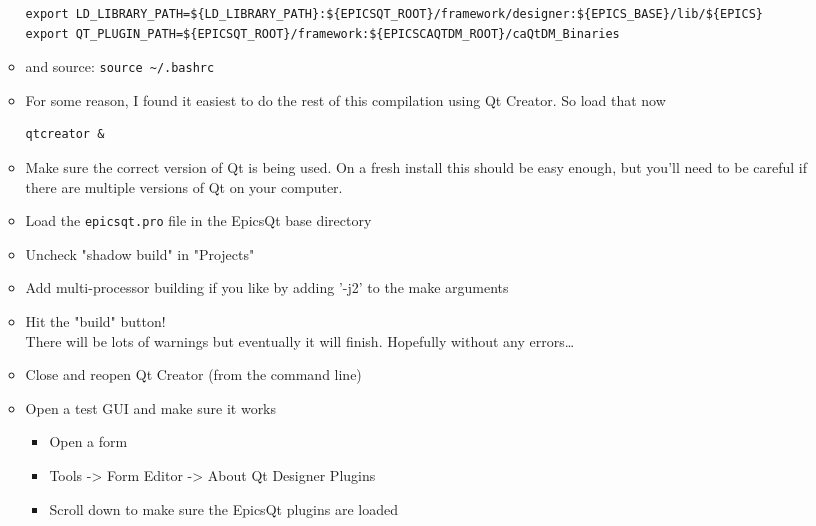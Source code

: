 \documentclass[11pt]{article}
\begin{document}
\begin{enumerate}
\begin{itemize}
\begin{verbatim}
export LD_LIBRARY_PATH=${LD_LIBRARY_PATH}:${EPICSQT_ROOT}/framework/designer:${EPICS_BASE}/lib/${EPICS}
export QT_PLUGIN_PATH=${EPICSQT_ROOT}/framework:${EPICSCAQTDM_ROOT}/caQtDM_Binaries
\end{verbatim}
\item and source: \verb,source ~/.bashrc,
\item For some reason, I found it easiest to do the rest of this
compilation using Qt Creator. So load that now
\begin{verbatim}
qtcreator &
\end{verbatim}
\item Make sure the correct version of Qt is being used. On a fresh
install this should be easy enough, but you'll need to be
careful if there are multiple versions of Qt on your computer.
\item Load the \verb~epicsqt.pro~ file in the EpicsQt base directory
\item Uncheck "shadow build" in "Projects"
\item Add multi-processor building if you like by adding '-j2' to the
make arguments
\item Hit the "build" button!\\
      There will be lots of warnings but eventually it will
finish. Hopefully without any errors\ldots{}
\item Close and reopen Qt Creator (from the command line)
\item Open a test GUI and make sure it works
\begin{itemize}
\item Open a form
\item Tools -> Form Editor -> About Qt Designer Plugins
\item Scroll down to make sure the EpicsQt plugins are loaded
\end{itemize}
\end{itemize}
\end{enumerate}
\end{document}
